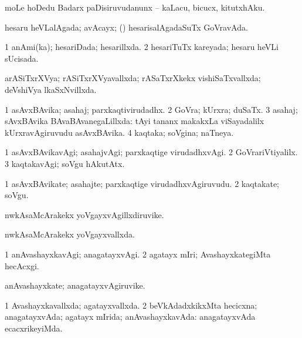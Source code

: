 {{\bentry
{} 
\gl{\sakirx}
\expl{}
\bmng
moLe hoDedu Badarx paDisiruvudanunx -- kaLacu, bicucx, kitutxhAku. 
\emng
\eentry

\bentry
{} 
\gl{\gu}
\expl{}
\bmng
hesaru heVLalAgada; avAcayx; (\kanmu) hesarisalAgadaSuTx GoVravAda. 
\emng
\eentry

\bentry
{} 
\gl{\gu}
\expl{}
\bmng
\bnum
\num{1} anAmi(ka); hesariDada; hesarillxda. 
\num{2} hesariTuTx kareyada; hesaru heVLi sUcisada. 
\enum
\emng
\eentry

\bentry
{} 
\gl{\gu}
\expl{}
\bmng
arASiTxrXVya; rASiTxrXVyavallxda; rASaTxrXkekx vishiSaTxvallxda; deVshiVya lkaSxNvillxda. 
\emng
\eentry

\bentry
{} 
\gl{\gu}
\expl{}
\bmng
\bnum
\num{1} asAvxBAvika; asahaj; parxkaqtivirudadhx. 
\num{2} GoVra; kUrxra; duSaTx. 
\num{3} asahaj; sAvxBAvika BAvaBAvanegaLillxda:  tAyi tananx makakxLa viSayadalilx kUrxravAgiruvudu asAvxBAvika. 
\num{4} kaqtaka; soVgina; naTneya. 
\enum
\emng
\eentry

\bentry
{} 
\gl{\kirxvi}
\expl{}
\bmng
\bnum
\num{1} asAvxBAvikavAgi; asahajvAgi; parxkaqtige virudadhxvAgi. 
\num{2} GoVrariVtiyalilx. 
\num{3} kaqtakavAgi; soVgu hAkutAtx. 
\enum
\emng
\eentry

\bentry
{} 
\gl{\nA}
\expl{}
\bmng
\bnum
\num{1} asAvxBAvikate; asahajte; parxkaqtige virudadhxvAgiruvudu. 
\num{2} kaqtakate; soVgu. 
\enum
\emng
\eentry

\bentry
{} 
\gl{\nA}
\expl{}
\bmng
nwkAsaMcArakekx yoVgayxvAgillxdiruvike. 
\emng
\eentry

\bentry
{} 
\gl{\gu}
\expl{}
\bmng
nwkAsaMcArakekx yoVgayxvallxda. 
\emng
\eentry

\bentry
{} 
\gl{\kirxvi}
\expl{}
\bmng
\bnum
\num{1} anAvashayxkavAgi; anagatayxvAgi. 
\num{2} agatayx mIri; AvashayxkategiMta hecAcxgi. 
\enum
\emng
\eentry

\bentry
{} 
\gl{\nA}
\expl{}
\bmng
anAvashayxkate; anagatayxvAgiruvike. 
\emng
\eentry

\bentry
{} 
\gl{\gu}
\expl{}
\bmng
\bnum
\num{1} Avashayxkavallxda; agatayxvallxda. 
\num{2} beVkAdadxkikxMta hecicxna; anagatayxvAda; agatayx mIrida; anAvashayxkavAda:  anagatayxvAda ecacxrikeyiMda. 
\enum
\emng
\eentry

}}
